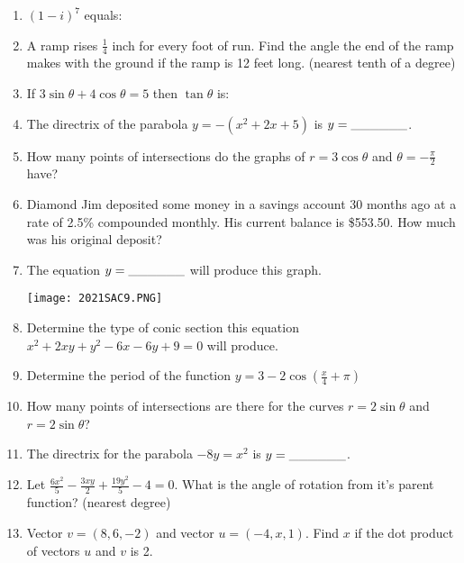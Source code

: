 \documentclass[../uilmath.tex]{subfiles}
\begin{document}
\begin{enumerate}[label=\bfseries\arabic*.]
    \item %
    $(1-i)^7$ equals:

    \item %
    A ramp rises $\frac{1}{4}$ inch for every foot of run. Find the angle the end of the ramp 
    makes with the ground if the ramp is 12 feet long. (nearest tenth of a degree)

    \item %
    If $3\sin\theta + 4\cos\theta = 5$ then $\tan\theta$ is: 

    \item %
    The directrix of the parabola $y=-(x^2+2x+5)$ is $y=\_\_\_\_\_\_$.

    \item %
    How many points of intersections do the graphs of $r=3\cos\theta$ and $\theta=-\frac{\pi}{2}$ have?
    
    \item %
    Diamond Jim deposited some money in a savings account 30 months ago at a rate of 2.5\% compounded monthly.
    His current balance is \$553.50. How much was his original deposit?

    \item %
    The equation $y=\_\_\_\_\_\_$ will produce this graph.
    \begin{center}
        \texttt{[image: 2021SAC9.PNG]}
    \end{center}

    \item %
    Determine the type of conic section this equation $x^2+2xy+y^2-6x-6y+9=0$ will produce.

    \item %
    Determine the period of the function $y=3-2\cos\left(\frac{x}{4}+\pi\right)$

    \item %
    How many points of intersections are there for the curves $r=2\sin\theta$ and $r=2\sin\theta$?

    \item %
    The directrix for the parabola $-8y=x^2$ is $y=\_\_\_\_\_\_$.

    \item %
    Let $\frac{6x^2}{5}-\frac{3xy}{2}+\frac{19y^2}{5}-4=0$. What is the angle of rotation from it's parent function? (nearest degree)

    \item %
    Vector $v=(8,6,-2)$ and vector $u=(-4,x,1)$. Find $x$ if the dot product of vectors $u$ and $v$ is 2.


\end{enumerate}
\end{document}
